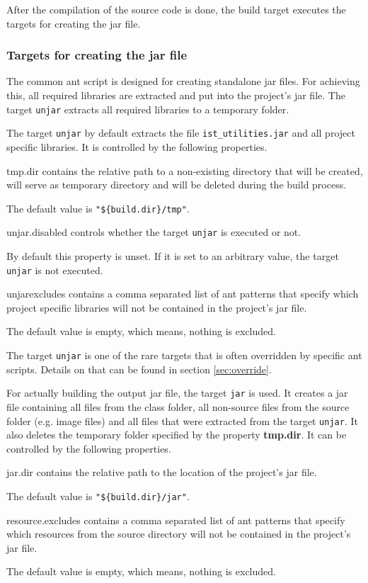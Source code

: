 \documentclass[a4paper,twoside,11pt,bibtotoc]{article}
\begin{document}
After the compilation of the source code is done, the build target executes the targets for creating the jar file.

\subsubsection{Targets for creating the jar file}
The common ant script is designed for creating standalone jar files.
For achieving this, all required libraries are extracted and put into the project's jar file.
The target \texttt{unjar} extracts all required libraries to a temporary folder.

The target \texttt{unjar} by default extracts the file \texttt{ist\_utilities.jar} and all project specific libraries.
It is controlled by the following properties.
\begin{description*}
	\item[tmp.dir] contains the relative path to a non-existing directory that will be created, will serve as temporary directory and will be deleted during the build process.\par The default value is \texttt{"\$\{build.dir\}/tmp"}.
	\item[unjar.disabled] controls whether the target \texttt{unjar} is executed or not.\par By default this property is unset. If it is set to an arbitrary value, the target \texttt{unjar} is not executed.
	\item[unjarexcludes] contains a comma separated list of ant patterns that specify which project specific libraries will not be contained in the project's jar file.\par The default value is empty, which means, nothing is excluded.
\end{description*}

The target \texttt{unjar} is one of the rare targets that is often overridden by specific ant scripts.
Details on that can be found in section \ref{sec:override}.

For actually building the output jar file, the target \texttt{jar} is used.
It creates a jar file containing all files from the class folder, all non-source files from the source folder (e.g. image files) and all files that were extracted from the target \texttt{unjar}.
It also deletes the temporary folder specified by the property \textbf{tmp.dir}.
It can be controlled by the following properties.

\begin{description*}
	\item[jar.dir] contains the relative path to the location of the project's jar file.\par The default value is \texttt{"\$\{build.dir\}/jar"}.
	\item[resource.excludes] contains a comma separated list of ant patterns that specify which resources from the source directory will not be contained in the project's jar file.\par The default value is empty, which means, nothing is excluded.
\end{description*}
\end{document}
